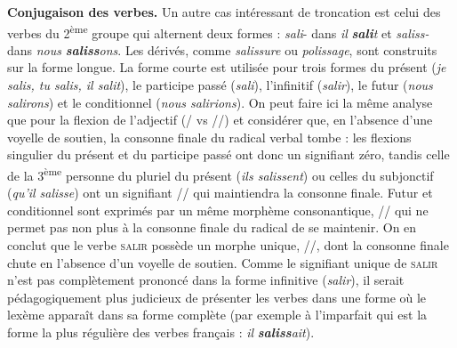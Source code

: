 {   \smallskip \noindent \textbf{Conjugaison des verbes.} 
    Un autre cas intéressant de troncation est celui des verbes du 2\textsuperscript{ème} groupe qui alternent deux formes : \textit{sali}{}- dans \textit{il} \textbf{\textit{sali}}\textit{t} et \textit{saliss-} dans \textit{nous} \textbf{\textit{saliss}}\textit{ons}. Les dérivés, comme \textit{salissure} ou \textit{polissage}, sont construits sur la forme longue. La forme courte est utilisée pour trois formes du présent (\textit{je salis, tu salis, il salit}), le participe passé (\textit{sali}), l’infinitif (\textit{salir}), le futur (\textit{nous salirons}) et le conditionnel (\textit{nous salirions}). On peut faire ici la même analyse que pour la flexion de l’adjectif (/ vs //) et considérer que, en l’absence d’une voyelle de soutien, la consonne finale du radical verbal tombe : les flexions singulier du présent et du participe passé ont donc un signifiant zéro, tandis celle de la 3\textsuperscript{ème} personne du pluriel du présent (\textit{ils salissent}) ou celles du subjonctif (\textit{qu’il salisse}) ont un signifiant \textstylePhonoApprofondissement{{}-}// qui maintiendra la consonne finale. Futur et conditionnel sont exprimés par un même morphème consonantique, \textstylePhonoApprofondissement{{}-}//\textstylePhonoApprofondissement{{}-} qui ne permet pas non plus à la consonne finale du radical de se maintenir. On en conclut que le verbe \textsc{salir} possède un morphe unique, //, dont la consonne finale chute en l’absence d’un voyelle de soutien. Comme le signifiant unique de \textsc{salir} n’est pas complètement prononcé dans la forme infinitive (\textit{salir}), il serait pédagogiquement plus judicieux de présenter les verbes dans une forme où le lexème apparaît dans sa forme complète (par exemple à l’imparfait qui est la forme la plus régulière des verbes français : \textit{il} \textbf{\textit{saliss}}\textit{ait}).

}
